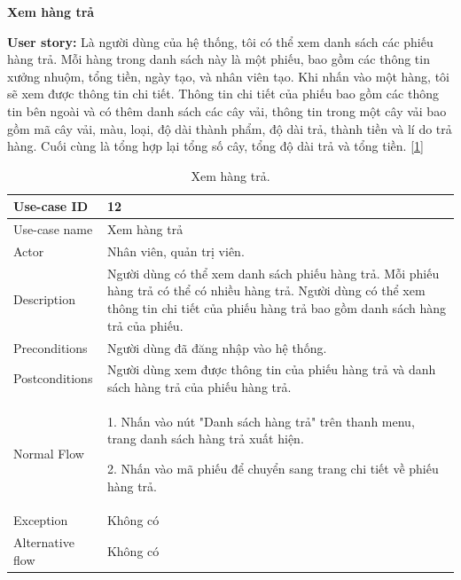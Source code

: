 \newpage
\textbf{Xem hàng trả}\par
\textbf{User story:} Là người dùng của hệ thống, tôi có thể xem danh sách các phiếu hàng trả. Mỗi hàng trong danh sách này là một phiếu, bao gồm các thông tin xưởng nhuộm, tổng tiền, ngày tạo, và nhân viên tạo. Khi nhấn vào một hàng, tôi sẽ xem được thông tin chi tiết. Thông tin chi tiết của phiếu bao gồm các thông tin bên ngoài và có thêm danh sách các cây vải, thông tin trong một cây vải bao gồm mã cây vải, màu, loại, độ dài thành phẩm, độ dài trả, thành tiền và lí do trả hàng. Cuối cùng là tổng hợp lại tổng số cây, tổng độ dài trả và tổng tiền. [\ref{bang12}]
\begin{table}[!htp]
    \centering
    \begin{tabular}{|m{3cm}|m{10cm}|}
    \hline 
        Use-case ID & 12\\ \hline
        Use-case name & Xem hàng trả\\ \hline
        Actor & Nhân viên, quản trị viên.\\ \hline
        Description & Người dùng có thể xem danh sách phiếu hàng trả. Mỗi phiếu hàng trả có thể có nhiều hàng trả. Người dùng có thể xem thông tin chi tiết của phiếu hàng trả bao gồm danh sách hàng trả của phiếu.\\ \hline
        Preconditions & Người dùng đã đăng nhập vào hệ thống.\\ \hline
        Postconditions & Người dùng xem được thông tin của phiếu hàng trả và danh sách hàng trả của phiếu hàng trả.\\ \hline
        Normal Flow & 
        1. Nhấn vào nút "Danh sách hàng trả" trên thanh menu, trang danh sách hàng trả xuất hiện.\par
        2. Nhấn vào mã phiếu để chuyển sang trang chi tiết về phiếu hàng trả.
        \\ \hline
        Exception & Không có\\ \hline
        Alternative flow & Không có\\ 
    \hline 
    \end{tabular}
    \caption{Xem hàng trả.}
    \label{bang12}
\end{table}

